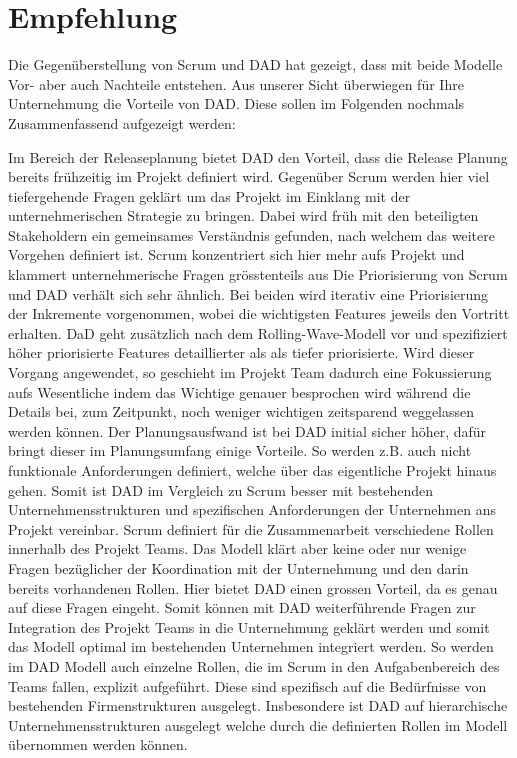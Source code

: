 \section{Empfehlung}

Die Gegenüberstellung von Scrum und DAD hat gezeigt, dass mit beide Modelle Vor- aber auch Nachteile entstehen. Aus unserer Sicht überwiegen für Ihre Unternehmung die Vorteile von DAD. Diese sollen im Folgenden nochmals Zusammenfassend aufgezeigt werden:

Im Bereich der Releaseplanung bietet DAD den Vorteil, dass die Release Planung bereits frühzeitig im Projekt definiert wird. Gegenüber Scrum werden hier viel tiefergehende Fragen geklärt um das Projekt im Einklang mit der unternehmerischen Strategie zu bringen. Dabei wird früh mit den beteiligten Stakeholdern ein gemeinsames Verständnis gefunden, nach welchem das weitere Vorgehen definiert ist. Scrum konzentriert sich hier mehr aufs Projekt und klammert unternehmerische Fragen grösstenteils aus\newline
Die Priorisierung von Scrum und DAD verhält sich sehr ähnlich. Bei beiden wird iterativ eine Priorisierung der Inkremente vorgenommen, wobei die wichtigsten Features jeweils den Vortritt erhalten. DaD geht zusätzlich nach dem Rolling-Wave-Modell vor und spezifiziert höher priorisierte Features detaillierter als als tiefer priorisierte. Wird dieser Vorgang angewendet, so geschieht im Projekt Team dadurch eine Fokussierung aufs Wesentliche indem das Wichtige genauer besprochen wird während die Details bei, zum Zeitpunkt, noch weniger wichtigen zeitsparend weggelassen werden können.
Der Planungsausfwand ist bei DAD initial sicher höher, dafür bringt dieser im Planungsumfang einige Vorteile. So werden z.B. auch nicht funktionale Anforderungen definiert, welche über das eigentliche Projekt hinaus gehen. Somit ist DAD im Vergleich zu Scrum besser mit bestehenden Unternehmensstrukturen und spezifischen Anforderungen der Unternehmen ans Projekt vereinbar. \newline
Scrum definiert für die Zusammenarbeit verschiedene Rollen innerhalb des Projekt Teams. Das Modell klärt aber keine oder nur wenige Fragen bezüglicher der Koordination mit der Unternehmung und den darin bereits vorhandenen Rollen. Hier bietet DAD einen grossen Vorteil, da es genau auf diese Fragen eingeht. Somit können mit DAD weiterführende Fragen zur Integration des Projekt Teams in die Unternehmung geklärt werden und somit das Modell optimal im bestehenden Unternehmen integriert werden. So werden im DAD Modell auch einzelne Rollen, die im Scrum in den Aufgabenbereich des Teams fallen, explizit aufgeführt. Diese sind spezifisch auf die Bedürfnisse von bestehenden Firmenstrukturen ausgelegt. Insbesondere ist DAD auf hierarchische Unternehmensstrukturen ausgelegt welche durch die definierten Rollen im Modell übernommen werden können.\newline
